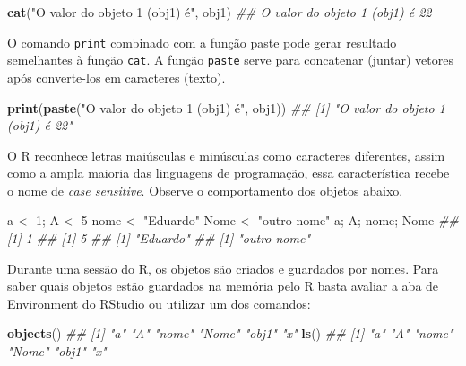 \documentclass[
  11pt,
  a5paper,
  openany]{book}
\newenvironment{Shaded}{\begin{snugshade}}{\end{snugshade}}
\newcommand{\CommentTok}[1]{\textcolor[rgb]{0.56,0.35,0.01}{\textit{#1}}}
\newcommand{\DecValTok}[1]{\textcolor[rgb]{0.00,0.00,0.81}{#1}}
\newcommand{\KeywordTok}[1]{\textcolor[rgb]{0.13,0.29,0.53}{\textbf{#1}}}
\newcommand{\NormalTok}[1]{#1}
\newcommand{\StringTok}[1]{\textcolor[rgb]{0.31,0.60,0.02}{#1}}
\begin{document}
\begin{Shaded}
\begin{Highlighting}[]
\KeywordTok{cat}\NormalTok{(}\StringTok{"O valor do objeto 1 (obj1) é"}\NormalTok{, obj1)}
\CommentTok{## O valor do objeto 1 (obj1) é 22}
\end{Highlighting}
\end{Shaded}

O comando \texttt{print} combinado com a função paste pode gerar resultado semelhantes à função \texttt{cat}. A função \texttt{paste} serve para concatenar (juntar) vetores após converte-los em caracteres (texto).

\begin{Shaded}
\begin{Highlighting}[]
\KeywordTok{print}\NormalTok{(}\KeywordTok{paste}\NormalTok{(}\StringTok{"O valor do objeto 1 (obj1) é"}\NormalTok{, obj1))}
\CommentTok{## [1] "O valor do objeto 1 (obj1) é 22"}
\end{Highlighting}
\end{Shaded}

O R reconhece letras maiúsculas e minúsculas como caracteres diferentes, assim como a ampla maioria das linguagens de programação, essa característica recebe o nome de \emph{case sensitive}. Observe o comportamento dos objetos abaixo.

\begin{Shaded}
\begin{Highlighting}[]
\NormalTok{a <-}\StringTok{ }\DecValTok{1}\NormalTok{; A <-}\StringTok{ }\DecValTok{5}
\NormalTok{nome <-}\StringTok{ "Eduardo"}
\NormalTok{Nome <-}\StringTok{ "outro nome"}
\NormalTok{a; A; nome; Nome}
\CommentTok{## [1] 1}
\CommentTok{## [1] 5}
\CommentTok{## [1] "Eduardo"}
\CommentTok{## [1] "outro nome"}
\end{Highlighting}
\end{Shaded}

Durante uma sessão do R, os objetos são criados e guardados por nomes. Para saber quais objetos estão guardados na memória pelo R basta avaliar a aba de Environment do RStudio ou utilizar um dos comandos:

\begin{Shaded}
\begin{Highlighting}[]
\KeywordTok{objects}\NormalTok{()}
\CommentTok{## [1] "a" "A" "nome" "Nome" "obj1" "x"   }
\KeywordTok{ls}\NormalTok{()}
\CommentTok{## [1] "a" "A" "nome" "Nome" "obj1" "x"   }
\end{Highlighting}
\end{Shaded}
\end{document}
